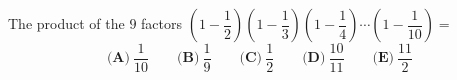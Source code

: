 The product of the $9$ factors $\left(1-\dfrac12\right)\left(1-\dfrac13\right)\left(1-\dfrac14\right)\cdots\left(1-\dfrac{1}{10}\right)=$
\[\textbf{(A)}\ \dfrac{1}{10}\qquad\textbf{(B)}\ \dfrac{1}{9}\qquad\textbf{(C)}\ \dfrac{1}{2}\qquad\textbf{(D)}\ \dfrac{10}{11}\qquad\textbf{(E)}\ \dfrac{11}{2}\]
